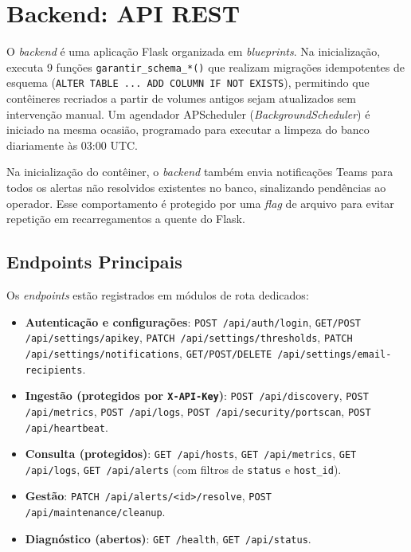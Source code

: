 \documentclass[
    12pt
    ,oneside
    ,a4paper
    ,chapter=TITLE
    ,section=TITLE
    ,sumario=abnt-6027-2012]{abntex2}
\begin{document}
\section{Backend: API REST}
\label{sec:backend}

O \textit{backend} é uma aplicação Flask organizada em \textit{blueprints}. Na
inicialização, executa 9 funções \texttt{garantir\_schema\_*()} que realizam migrações
idempotentes de esquema (\texttt{ALTER TABLE ... ADD COLUMN IF NOT EXISTS}), permitindo
que contêineres recriados a partir de volumes antigos sejam atualizados sem intervenção
manual. Um agendador APScheduler (\textit{BackgroundScheduler}) é iniciado na mesma
ocasião, programado para executar a limpeza do banco diariamente às 03:00 UTC.

Na inicialização do contêiner, o \textit{backend} também envia notificações Teams para
todos os alertas não resolvidos existentes no banco, sinalizando pendências ao operador.
Esse comportamento é protegido por uma \textit{flag} de arquivo para evitar repetição
em recarregamentos a quente do Flask.

\subsection{Endpoints Principais}
\label{subsec:endpoints}

Os \textit{endpoints} estão registrados em módulos de rota dedicados:

\begin{itemize}
    \item \textbf{Autenticação e configurações}: \texttt{POST /api/auth/login},
          \texttt{GET/POST /api/settings/apikey},
          \texttt{PATCH /api/settings/thresholds},
          \texttt{PATCH /api/settings/notifications},
          \texttt{GET/POST/DELETE /api/settings/email-recipients}.
    \item \textbf{Ingestão (protegidos por \texttt{X-API-Key})}:
          \texttt{POST /api/discovery}, \texttt{POST /api/metrics},
          \texttt{POST /api/logs}, \texttt{POST /api/security/portscan},
          \texttt{POST /api/heartbeat}.
    \item \textbf{Consulta (protegidos)}: \texttt{GET /api/hosts},
          \texttt{GET /api/metrics}, \texttt{GET /api/logs},
          \texttt{GET /api/alerts} (com filtros de \texttt{status} e
          \texttt{host\_id}).
    \item \textbf{Gestão}: \texttt{PATCH /api/alerts/<id>/resolve},
          \texttt{POST /api/maintenance/cleanup}.
    \item \textbf{Diagnóstico (abertos)}: \texttt{GET /health},
          \texttt{GET /api/status}.
\end{itemize}
\end{document}

